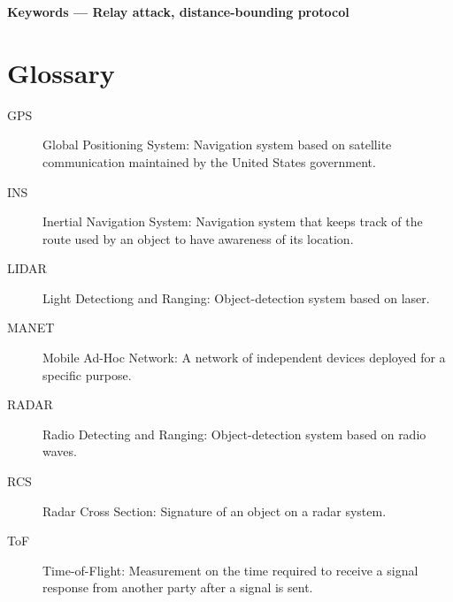 \documentclass{article}
\begin{document}
\renewcommand{\abstractname}{\Large Abstract}
\begin{abstract}
Distance-bounding protocols have been for a long time a research topic due their usefulness as a security feature for systems that assume a specific proximity between parties. However, no studies could be found in the current literature regarding attacks that fake increased distance reports.

This research project first discusses alternative solutions using other systems such as radar and GPS. An analysis on why these systems are not enough to solve the problem in the current state of the art is provided.

Afterwards, some real world scenarios are presented, in which the security of these applications could be compromised. An explanation of how relay attacks could interfere the expected behaviour of these systems is provided, followed by an evaluation of the consequences it might have for each one of them.

Some low-cost, easy-to-implement solutions are proposed, which greatly diminish the success chances of this kind of attacks against this protocol.
\end{abstract}

{\bf Keywords --- Relay attack, distance-bounding protocol} 

\newpage

\section*{Glossary}
\addtocounter{section}{0}

\begin{description}
  \item[GPS] Global Positioning System: Navigation system based on satellite communication maintained by the United States government.
  \item[INS] Inertial Navigation System: Navigation system that keeps track of the route used by an object to have awareness of its location.
  \item[LIDAR] Light Detectiong and Ranging: Object-detection system based on laser.
  \item[MANET] Mobile Ad-Hoc Network: A network of independent devices deployed for a specific purpose.
  \item[RADAR] Radio Detecting and Ranging: Object-detection system based on radio waves.
  \item[RCS] Radar Cross Section: Signature of an object on a radar system.
  \item[ToF] Time-of-Flight: Measurement on the time required to receive a signal response from another party after a signal is sent.
\end{description}
\end{document}
